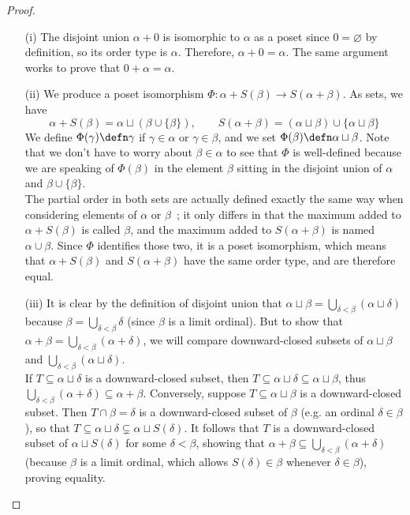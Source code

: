 \begin{proof}
    \begin{itemize}
        \item[(i)] The disjoint union $\alpha + 0$ is isomorphic to $\alpha$ as a poset since $0 = \varnothing$ by definition, so its order type is $\alpha$. Therefore, $\alpha + 0 = \alpha$. The same argument works to prove that $0 + \alpha = \alpha$. \\

        \item[(ii)] We produce a poset isomorphism $\Phi : \alpha + S(\beta) \to S(\alpha + \beta)$. As sets, we have 
        \[
            \alpha + S(\beta) = \alpha \sqcup (\beta \cup \{ \beta \}), \qquad S(\alpha+\beta) = (\alpha \sqcup \beta) \cup \{ \alpha \sqcup \beta \}    
        \] 
        We define $\Phi(\gamma) \defn \gamma$ if $\gamma \in \alpha$ or $\gamma \in \beta$, and we set $\Phi(\beta) \defn \alpha \sqcup \beta$. Note that we don't have to worry about $\beta \in \alpha$ to see that $\Phi$ is well-defined because we are speaking of $\Phi(\beta)$ in the element $\beta$ sitting in the disjoint union of $\alpha$ and $\beta \cup \{\beta\}$. 
        \\

        The partial order in both sets are actually defined exactly the same way when considering elements of $\alpha$ or $\beta$~; it only differs in that the maximum added to $\alpha + S(\beta)$ is called $\beta$, and the maximum added to $S(\alpha + \beta)$ is named $\alpha \cup \beta$. Since $\Phi$ identifies those two, it is a poset isomorphism, which means that $\alpha + S(\beta)$ and $S(\alpha + \beta)$ have the same order type, and are therefore equal.
        \\

        \item[(iii)] It is clear by the definition of disjoint union that $\alpha \sqcup \beta = \bigcup_{\delta < \beta} (\alpha \sqcup \delta)$ because $\beta = \bigcup_{\delta < \beta} \delta$ (since $\beta$ is a limit ordinal). But to show that $\alpha + \beta = \bigcup_{\delta < \beta} (\alpha + \delta)$, we will compare downward-closed subsets of $\alpha \sqcup \beta$ and $\bigcup_{\delta < \beta} (\alpha \sqcup \delta)$.
        \\
        
        If $T \subseteq \alpha \sqcup \delta$ is a downward-closed subset, then $T \subseteq \alpha \sqcup \delta \subseteq \alpha \sqcup \beta$, thus $\bigcup_{\delta < \beta} (\alpha + \delta) \subseteq \alpha + \beta$. Conversely, suppose $T \subseteq \alpha \sqcup \beta$ is a downward-closed subset. Then $T \cap \beta = \delta$ is a downward-closed subset of $\beta$ (e.g. an ordinal $\delta \in \beta$), so that $T \subseteq \alpha \sqcup \delta \subsetneq \alpha \sqcup S(\delta)$. It follows that $T$ is a downward-closed subset of $\alpha \sqcup S(\delta)$ for some $\delta < \beta$, showing that $\alpha + \beta \subseteq \bigcup_{\delta < \beta} (\alpha + \delta)$ (because $\beta$ is a limit ordinal, which allows $S(\delta) \in \beta$ whenever $\delta \in \beta$), proving equality.
        \\


\end{itemize}
\end{proof}
